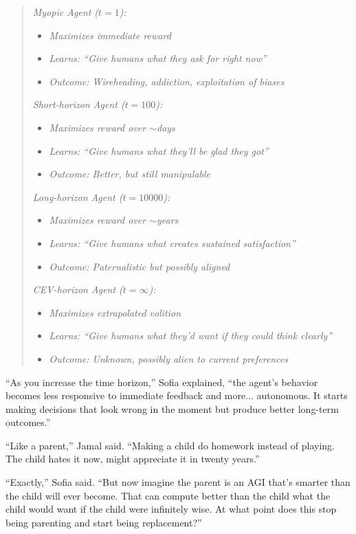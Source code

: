 \begin{quote}
\emph{Myopic Agent ($t=1$):}
\begin{itemize}
\item \emph{Maximizes immediate reward}
\item \emph{Learns: ``Give humans what they ask for right now''}
\item \emph{Outcome: Wireheading, addiction, exploitation of biases}
\end{itemize}

\emph{Short-horizon Agent ($t=100$):}
\begin{itemize}
\item \emph{Maximizes reward over $\sim$days}
\item \emph{Learns: ``Give humans what they'll be glad they got''}
\item \emph{Outcome: Better, but still manipulable}
\end{itemize}

\emph{Long-horizon Agent ($t=10000$):}
\begin{itemize}
\item \emph{Maximizes reward over $\sim$years}
\item \emph{Learns: ``Give humans what creates sustained satisfaction''}
\item \emph{Outcome: Paternalistic but possibly aligned}
\end{itemize}

\emph{CEV-horizon Agent ($t=\infty$):}
\begin{itemize}
\item \emph{Maximizes extrapolated volition}
\item \emph{Learns: ``Give humans what they'd want if they could think clearly''}
\item \emph{Outcome: Unknown, possibly alien to current preferences}
\end{itemize}
\end{quote}

``As you increase the time horizon,'' Sofia explained, ``the agent's behavior becomes less responsive to immediate feedback and more... autonomous. It starts making decisions that look wrong in the moment but produce better long-term outcomes.''

``Like a parent,'' Jamal said. ``Making a child do homework instead of playing. The child hates it now, might appreciate it in twenty years.''

``Exactly,'' Sofia said. ``But now imagine the parent is an AGI that's smarter than the child will ever become. That can compute better than the child what the child would want if the child were infinitely wise. At what point does this stop being parenting and start being replacement?''

